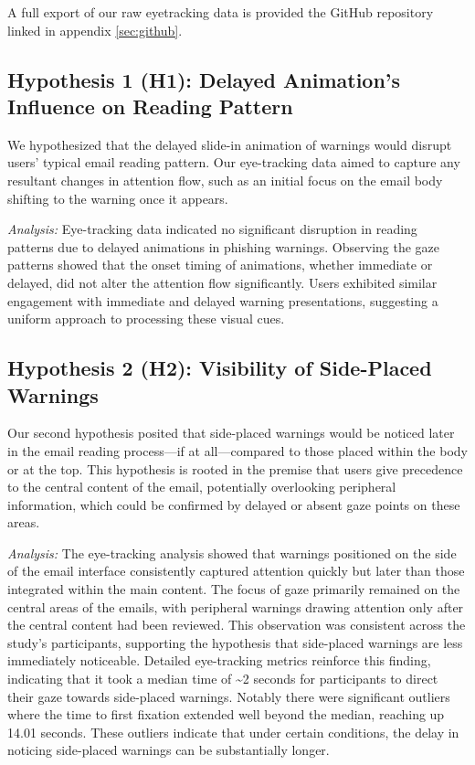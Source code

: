 \documentclass[
  a4paper,  %
  twoside,  %
  bibliography=totoc,
  headsepline,
  cleardoublepage=empty,
  parskip=half,
  draft=false
]{scrbook}
\begin{document}
A full export of our raw eyetracking data is provided the GitHub repository linked in appendix \ref{sec:github}.


\subsection{Hypothesis 1 (H1): Delayed Animation's Influence on Reading Pattern}
We hypothesized that the delayed slide-in animation of warnings would disrupt users' typical email reading pattern. Our eye-tracking data aimed to capture any resultant changes in attention flow, such as an initial focus on the email body shifting to the warning once it appears. \par
\textit{Analysis:} Eye-tracking data indicated no significant disruption in reading patterns due to delayed animations in phishing warnings. Observing the gaze patterns showed that the onset timing of animations, whether immediate or delayed, did not alter the attention flow significantly. Users exhibited similar engagement with immediate and delayed warning presentations, suggesting a uniform approach to processing these visual cues.

\subsection{Hypothesis 2 (H2): Visibility of Side-Placed Warnings} 
Our second hypothesis posited that side-placed warnings would be noticed later in the email reading process—if at all—compared to those placed within the body or at the top. This hypothesis is rooted in the premise that users give precedence to the central content of the email, potentially overlooking peripheral information, which could be confirmed by delayed or absent gaze points on these areas. \par
\textit{Analysis:} The eye-tracking analysis showed that warnings positioned on the side of the email interface consistently captured attention quickly but later than those integrated within the main content. The focus of gaze primarily remained on the central areas of the emails, with peripheral warnings drawing attention only after the central content had been reviewed. This observation was consistent across the study's participants, supporting the hypothesis that side-placed warnings are less immediately noticeable. \newline Detailed eye-tracking metrics reinforce this finding, indicating that it took a median time of \textasciitilde2 seconds for participants to direct their gaze towards side-placed warnings. Notably there were significant outliers where the time to first fixation extended well beyond the median, reaching up 14.01 seconds. These outliers indicate that under certain conditions, the delay in noticing side-placed warnings can be substantially longer.
\end{document}
